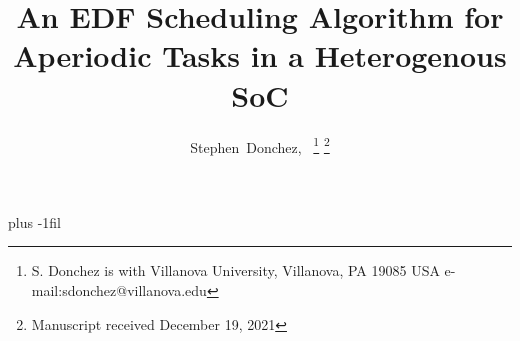 \documentclass[journal]{LaTeX_Assets/IEEETransactions_LaTeX/IEEEtran/IEEEtran}
\begin{document}
    \title{An EDF Scheduling Algorithm for Aperiodic Tasks in a Heterogenous SoC}
    \author{Stephen~Donchez,~%
    \thanks{S. Donchez is with Villanova University, Villanova, PA 19085 USA 
    \mbox{e-mail:sdonchez@villanova.edu}}%
    \thanks{Manuscript received December 19, 2021}}%

    \maketitle

    

    

     
    
    
    

    

    
    
    

    \vskip 0pt plus -1fil

    
\end{document}

